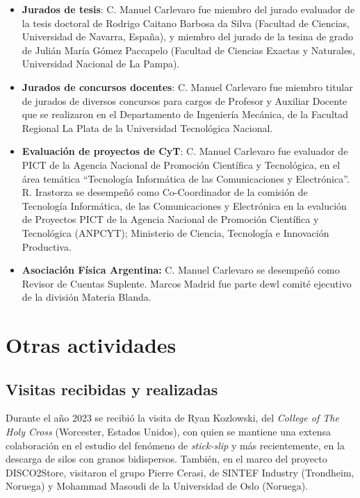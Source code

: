\documentclass[a4paper,11pt,twoside,final,titlepage,onecolumn,openright]{report}
\begin{document}
\begin{itemize}
\item \textbf{Jurados de tesis}: C. Manuel Carlevaro fue miembro del jurado evaluador de la tesis doctoral de Rodrigo Caitano Barbosa da Silva (Facultad de Ciencias, Universidad de Navarra, España), y miembro del jurado de la tesina de grado de Julián María Gómez Paccapelo (Facultad de Ciencias Exactas y Naturales, Universidad Nacional de La Pampa).

\item \textbf{Jurados de concursos docentes}: C. Manuel Carlevaro fue miembro titular de jurados de diversos concursos para cargos de Profesor y Auxiliar Docente que se realizaron en el Departamento de Ingeniería Mecánica, de la Facultad Regional La Plata de la Universidad Tecnológica Nacional.

\item \textbf{Evaluación de proyectos de CyT}: C. Manuel Carlevaro fue evaluador de PICT de la Agencia Nacional de Promoción Científica y Tecnológica, en el área temática ``Tecnología Informática de las Comunicaciones y Electrónica''. R. Irastorza se desempeñó como Co-Coordinador de la comisión de Tecnología Informática, de las Comunicaciones y Electrónica en la evalución de Proyectos PICT de la Agencia Nacional de Promoción Científica y Tecnológica (ANPCYT); Ministerio de Ciencia, Tecnología e Innovación Productiva. 
 
\item \textbf{Asociación Física Argentina:} C. Manuel Carlevaro se desempeñó como Revisor de Cuentas Suplente. Marcos Madrid fue parte dewl comité ejecutivo de la división Materia Blanda.
 
\end{itemize}


\section{Otras actividades}

\subsection{Visitas recibidas y realizadas}

Durante el año 2023 se recibió la visita de Ryan Kozlowski, del \textit{College of The Holy Cross} (Worcester, Estados Unidos), con quien se mantiene una extensa colaboración en el estudio del fenómeno de \textit{stick-slip} y más recientemente, en la descarga de silos con granos bidispersos. También, en el marco del proyecto DISCO2Store, visitaron el grupo Pierre Cerasi, de SINTEF Industry (Trondheim, Noruega) y Mohammad Masoudi de la Universidad de Oslo (Noruega).
\end{document}
